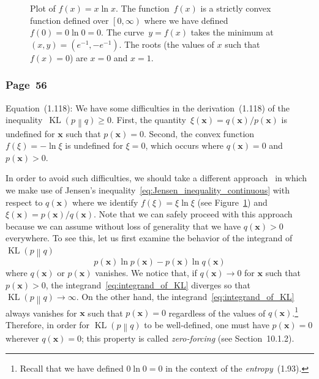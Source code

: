 \documentclass[12pt,a4paper]{article}
\newcommand{\erratum}[1]{%
\subsubsection*{#1}
\addcontentsline{toc}{subsection}{#1}}
\begin{document}
\begin{figure}
\centering

\caption{Plot of $f(x) = x \ln x$.
The function~$f(x)$ is a strictly convex function defined over $\left[0, \infty\right)$
where we have defined $f(0) = 0 \ln 0 = 0$.
The curve~$y = f(x)$ takes the minimum at $(x, y) = \left(e^{-1}, -e^{-1}\right)$.
The roots (the values of $x$ such that $f(x) = 0$) are $x = 0$ and $x = 1$.}
\label{fig:x_ln_x}
\end{figure}

\erratum{Page~56}
Equation~(1.118):
We have some difficulties in the derivation~(1.118) of
the inequality~$\operatorname{KL}\left( p \middle\| q \right) \geqslant 0$.
First, the quantity~$\xi(\mathbf{x}) = q(\mathbf{x})/p(\mathbf{x})$ is undefined for $\mathbf{x}$
such that $p(\mathbf{x}) = 0$.
Second, the convex function~$f(\xi) = -\ln\xi$ is undefined for $\xi = 0$,
which occurs where $q(\mathbf{x}) = 0$ and $p(\mathbf{x}) > 0$.

In order to avoid such difficulties,
we should take a different approach~\citep{MacKay:Information}
in which we make use of Jensen's inequality~\eqref{eq:Jensen_inequality_continuous}
with respect to $q(\mathbf{x})$ where
we identify $f(\xi) = \xi\ln\xi$ (see Figure~\ref{fig:x_ln_x}) and
$\xi(\mathbf{x}) = p(\mathbf{x})/q(\mathbf{x})$.
Note that we can safely proceed with this approach
because we can assume without loss of generality that
we have $q(\mathbf{x}) > 0$ everywhere.
To see this, let us first examine the behavior of the integrand of
$\operatorname{KL}\left( p \middle\| q \right)$
\begin{equation}
p(\mathbf{x}) \ln p(\mathbf{x}) - p(\mathbf{x}) \ln q(\mathbf{x})
\label{eq:integrand_of_KL}
\end{equation}
where $q(\mathbf{x})$ or $p(\mathbf{x})$ vanishes.
We notice that, if $q(\mathbf{x}) \to 0$ for $\mathbf{x}$ such that $p(\mathbf{x}) > 0$,
the integrand~\eqref{eq:integrand_of_KL} diverges so that
$\operatorname{KL}\left( p \middle\| q \right) \to \infty$.
On the other hand, the integrand~\eqref{eq:integrand_of_KL} always vanishes for $\mathbf{x}$
such that $p(\mathbf{x}) = 0$ regardless of the values of $q(\mathbf{x})$.\footnote{%
Recall that we have defined $0 \ln 0 = 0$ in the context of the \emph{entropy}~(1.93).}
Therefore, in order for $\operatorname{KL}\left( p \middle\| q \right)$ to be well-defined,
one must have $p(\mathbf{x}) = 0$ wherever $q(\mathbf{x}) = 0$;
this property is called \emph{zero-forcing} (see Section~10.1.2).
\end{document}
